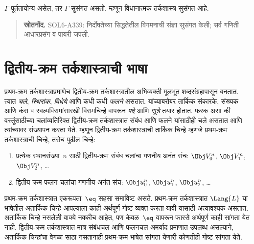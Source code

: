 \begin{cor}
$\Gamma$ पूर्ततायोग्य असेल, तर $\Gamma$ सुसंगत असतो. म्हणून
विधानात्मक तर्कशास्त्र सुसंगत आहे.
\end{cor}



\begin{quote}\small\textbf{स्रोतनोंद.} SOL6-A339: निर्दोषतेच्या सिद्धतेतील विगमनाची संज्ञा सुसंगत केली; सर्व गणिती आधारप्रसंग व पायरी जपली.\end{quote}










\section{द्वितीय-क्रम तर्कशास्त्राची भाषा}\label{sol:syn:lan:sec}

प्रथम-क्रम तर्कशास्त्राप्रमाणेच द्वितीय-क्रम तर्कशास्त्रातील
अभिव्यक्ती मूलभूत शब्दसंग्रहापासून बनतात. त्यात \emph{चले},
\emph{स्थिरांक}, \emph{विधेये} आणि कधी कधी
\emph{फलने} असतात. यांच्याबरोबर तार्किक संकारके,
संख्यक आणि कंस व स्वल्पविरामांसारखी विरामचिन्हे वापरून
\emph{पदे} आणि \emph{सूत्रे} तयार होतात. फरक असा की
वस्तूंसाठीच्या चलांव्यतिरिक्त द्वितीय-क्रम तर्कशास्त्रात संबंध
आणि फलने यांसाठीही चले असतात आणि त्यांच्यावर संख्यापन
करता येते. म्हणून द्वितीय-क्रम तर्कशास्त्राची तार्किक चिन्हे
म्हणजे प्रथम-क्रम तर्कशास्त्राची चिन्हे, तसेच पुढील चिन्हे:

\begin{enumerate}
\item प्रत्येक स्थानसंख्या~$n$ साठी द्वितीय-क्रम संबंध चलांचा
  गणनीय अनंत संच: $\Obj V_0^n$, $\Obj V_1^n$, $\Obj V_2^n$, \dots
\item द्वितीय-क्रम फलन चलांचा गणनीय अनंत संच:
  $\Obj u_0^n$, $\Obj u_1^n$, $\Obj u_2^n$, \dots
\end{enumerate}

प्रथम-क्रम तर्कशास्त्रात एकरूपता~$\eq$ सहसा समाविष्ट
असते. प्रथम-क्रम तर्कशास्त्रात $\Lang{L}$ या भाषेतील
अतार्किक चिन्हे आपल्याला काही अर्थपूर्ण गोष्ट व्यक्त करता
यावी यासाठी अत्यावश्यक असतात. अतार्किक चिन्हे नसलेली
वाक्ये नक्कीच आहेत, पण केवळ~$\eq$ वापरून
फारसे अर्थपूर्ण काही सांगता येत नाही. द्वितीय-क्रम
तर्कशास्त्रात मात्र संबंधचल आणि फलनचल अमर्याद प्रमाणात
उपलब्ध असल्याने, अतार्किक चिन्हांचा वेगळा साठा नसतानाही
प्रथम-क्रम भाषेत सांगता येणारी कोणतीही गोष्ट सांगता येते.












